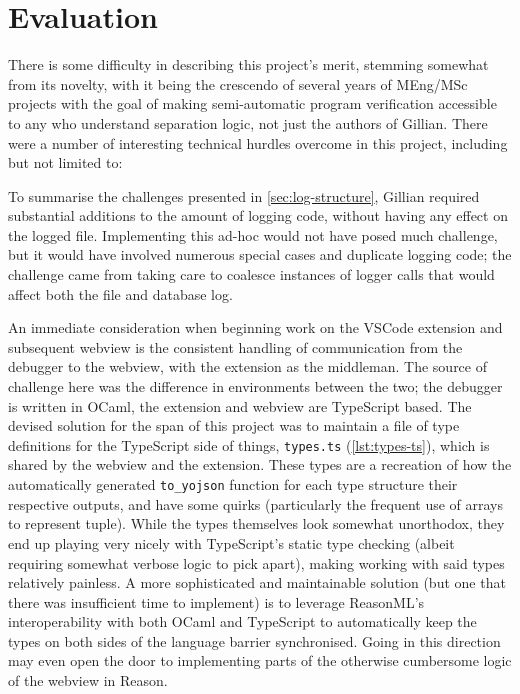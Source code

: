 
\chapter{Evaluation}\label{sec:eval}

There is some difficulty in describing this project's merit, stemming somewhat
from its novelty, with it being the crescendo of several years of MEng/MSc
projects with the goal of making semi-automatic program verification accessible
to any who understand separation logic, not just the authors of Gillian. There
were a number of interesting technical hurdles overcome in this project,
including but not limited to:

To summarise the challenges presented in \autoref{sec:log-structure}, Gillian
required substantial additions to the amount of logging code, without having
any effect on the logged file. Implementing this ad-hoc would not have posed
much challenge, but it would have involved numerous special cases and
duplicate logging code; the challenge came from taking care to coalesce
instances of logger calls that would affect both the file and database log.

An immediate consideration when beginning work on the VSCode extension and
subsequent webview is the consistent handling of communication from the debugger
to the webview, with the extension as the middleman. The source of challenge
here was the difference in environments between the two; the debugger is written
in OCaml, the extension and webview are TypeScript based. The devised solution
for the span of this project was to maintain a file of type definitions for the
TypeScript side of things, \texttt{types.ts} (\autoref{lst:types-ts}), which is
shared by the webview and the extension. These types are a recreation of how the
automatically generated \texttt{to\_yojson} function for each type structure
their respective outputs, and have some quirks (particularly the frequent use
of arrays to represent tuple). While the types themselves look somewhat
unorthodox, they end up playing very nicely with TypeScript's static type
checking (albeit requiring somewhat verbose logic to pick apart), making working
with said types relatively painless. A more sophisticated and maintainable
solution (but one that there was insufficient time to implement) is to leverage
ReasonML's~\cite{reason-ml} interoperability with both OCaml and TypeScript to
automatically keep the types on both sides of the language barrier synchronised.
Going in this direction may even open the door to implementing parts of the
otherwise cumbersome logic of the webview in Reason.

